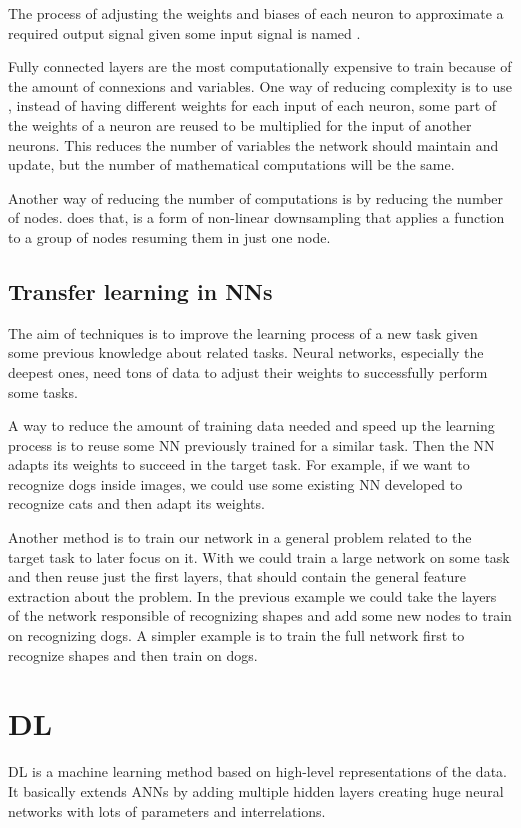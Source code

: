 The process of adjusting the weights and biases of each neuron to approximate a required output signal given some input
signal is named .

Fully connected layers are the most computationally expensive to train because of the amount of connexions and variables.
One way of reducing complexity is to use , instead of having different weights for each input of each neuron,
some part of the weights of a neuron are reused to be multiplied for the input of another neurons.
This reduces the number of variables the network should maintain and update, but the number of mathematical computations
will be the same.

Another way of reducing the number of computations is by reducing the number of nodes.
 does that, is a form of non-linear downsampling that applies a function to a group of nodes resuming them
in just one node.

\subsection{Transfer learning in \aclp{NN}}
The aim of  techniques is to improve the learning process of a new task given some previous knowledge
about related tasks.
Neural networks, especially the deepest ones, need tons of data to adjust their weights to successfully perform some tasks.

A way to reduce the amount of training data needed and speed up the learning process is to reuse some \ac{NN} previously
trained for a similar task.
Then the \ac{NN} adapts its weights to succeed in the target task.
For example, if we want to recognize dogs inside images, we could use some existing \ac{NN} developed to recognize cats and
then adapt its weights.

Another method is to train our network in a general problem related to the target task to later focus on it.
With  we could train a large network on some task and then reuse just the first layers, that should
contain the general feature extraction about the problem.
In the previous example we could take the layers of the network responsible of recognizing shapes and add some new nodes
to train on recognizing dogs.
A simpler example is to train the full network first to recognize shapes and then train on dogs.

\section{\acl{DL}}
\acf{DL} is a machine learning method based on high-level representations of the data.
It basically extends \acp{ANN} by adding multiple hidden layers creating huge neural networks with lots of parameters and interrelations.

